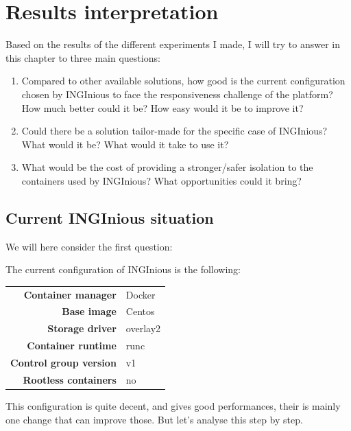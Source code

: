 \chapter{Results interpretation}

Based on the results of the different experiments I made, I will try to answer in this chapter to three main questions:
\begin{enumerate}
  \item Compared to other available solutions, how good is the current configuration chosen by INGInious to face the responsiveness challenge of the platform?  How much better could it be?  How easy would it be to improve it?
  \item Could there be a solution tailor-made for the specific case of INGInious?  What would it be?  What would it take to use it?
  \item What would be the cost of providing a stronger/safer isolation to the containers used by INGInious?  What opportunities could it bring?
\end{enumerate}

\section{Current INGInious situation}
We will here consider the first question:
\begin{center}
\end{center}

The current configuration of INGInious is the following:
\begin{center}
\begin{tabular}{rl}
  \textbf{Container manager} & Docker \\
  \textbf{Base image} & Centos \\
  \textbf{Storage driver} & overlay2 \\
  \textbf{Container runtime} & runc \\
  \textbf{Control group version} & v1 \\
  \textbf{Rootless containers} & no \\
\end{tabular}
\end{center}

This configuration is quite decent, and gives good performances, their is mainly one change that can improve those.  But let's analyse this step by step.

